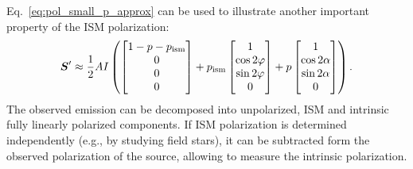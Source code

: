 Eq.~\ref{eq:pol_small_p_approx} can be used to illustrate another important property of the \gls{ISM} polarization:
\begin{equation}
    \boldsymbol{S}^\prime \approx \frac{1}{2} A I \left(
        \begin{bmatrix}
            1 - p - p_{\mathrm{ism}} \\ 0 \\ 0 \\ 0 \\
        \end{bmatrix}  + p_{\mathrm{ism}} 
        \begin{bmatrix}
            1 \\ \cos2\varphi \\ \sin2\varphi \\ 0 \\
        \end{bmatrix} + p
        \begin{bmatrix}
            1 \\ \cos2\alpha \\ \sin2\alpha \\ 0 \\
        \end{bmatrix}
    \right).
\end{equation}
The observed emission can be decomposed into unpolarized, \gls{ISM} and intrinsic fully linearly polarized components.
If \gls{ISM} polarization is determined independently (e.g., by studying field stars), it can be subtracted form the observed polarization of the source, allowing to measure the intrinsic polarization.

